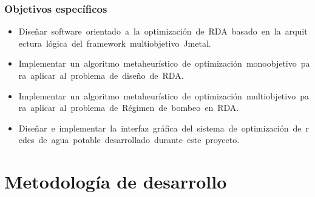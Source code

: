\documentclass[9pt]{beamer}
\begin{document}
    \begin{frame}
        \frametitle{Objetivos específicos}
        \begin{itemize}
            \justifying
            \item Diseñar software orientado a la optimización de RDA basado en la arquitectura lógica del framework multiobjetivo Jmetal.
            \item Implementar un algoritmo metaheurístico de optimización monoobjetivo para aplicar al problema de diseño de RDA.
            \item Implementar un algoritmo metaheurístico de optimización multiobjetivo para aplicar al problema de Régimen de bombeo en RDA.
            \item Diseñar e implementar la interfaz gráfica del sistema de optimización de redes de agua potable desarrollado durante este proyecto.
        \end{itemize}
    \end{frame}

    \section{Metodología de desarrollo}
\end{document}
